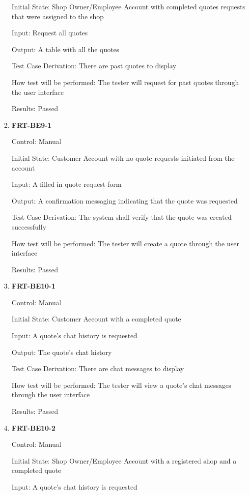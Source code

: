 \documentclass[12pt, titlepage]{article}
\begin{document}
\begin{enumerate}
	      Initial State: Shop Owner/Employee Account with completed quotes requests that were assigned to the
	      shop

	      Input: Request all quotes

	      Output: A table with all the quotes

	      Test Case Derivation: There are past quotes to display

	      How test will be performed: The tester will request for past quotes through the user interface

	      Results: Passed

	\item \textbf{FRT-BE9-1}

	      Control: Manual

	      Initial State: Customer Account with no quote requests initiated from the account

	      Input: A filled in quote request form

	      Output: A confirmation messaging indicating that the quote was requested

	      Test Case Derivation: The system shall verify that the quote was created successfully

	      How test will be performed: The tester will create a quote through the user interface

	      Results: Passed

	\item \textbf{FRT-BE10-1}

	      Control: Manual

	      Initial State: Customer Account with a completed quote

	      Input: A quote's chat history is requested

	      Output: The quote's chat history

	      Test Case Derivation: There are chat messages to display

	      How test will be performed: The tester will view a quote's chat messages through the user interface

	      Results: Passed

	\item \textbf{FRT-BE10-2}

	      Control: Manual

	      Initial State: Shop Owner/Employee Account with a registered shop and a completed quote

	      Input: A quote's chat history is requested


\end{enumerate}
\end{document}
